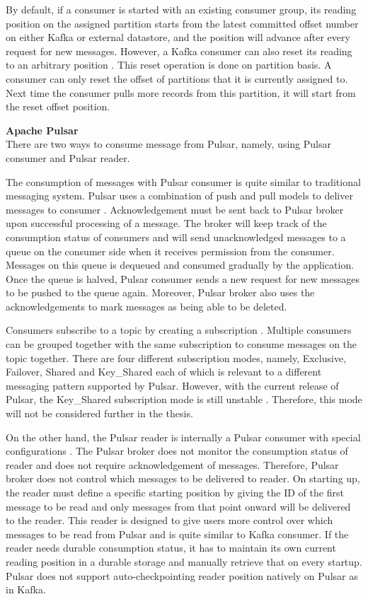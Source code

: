 By default, if a consumer is started with an existing consumer group, its reading position on the assigned partition starts from the latest committed offset number on either Kafka or external datastore, and the position will advance after every request for new messages. However, a Kafka consumer can also reset its reading to an arbitrary position \cite{kafkaconsumerimplement}. This reset operation is done on partition basis. A consumer can only reset the offset of partitions that it is currently assigned to. Next time the consumer pulls more records from this partition, it will start from the reset offset position.

\large \textbf{Apache Pulsar}\\
\normalsize
There are two ways to consume message from Pulsar, namely, using Pulsar consumer and Pulsar reader.

The consumption of messages with Pulsar consumer is quite similar to traditional messaging system. Pulsar uses a combination of push and pull models to deliver messages to consumer \cite{pulsarbinaryprotocol}. Acknowledgement must be sent back to Pulsar broker upon successful processing of a message. The broker will keep track of the consumption status of consumers and will send unacknowledged messages to a queue on the consumer side when it receives permission from the consumer. Messages on this queue is dequeued and consumed gradually by the application. Once the queue is halved, Pulsar consumer sends a new request for new messages to be pushed to the queue again. Moreover, Pulsar broker also uses the acknowledgements to mark messages as being able to be deleted.

Consumers subscribe to a topic by creating a subscription \cite{pulsarconceptmessaging}. Multiple consumers can be grouped together with the same subscription to consume messages on the topic together. There are four different subscription modes, namely, Exclusive, Failover, Shared and Key\_Shared each of which is relevant to a different messaging pattern supported by Pulsar. However, with the current release of Pulsar, the Key\_Shared subscription mode is still unstable \cite{pulsarkaysharedunstable}. Therefore, this mode will not be considered further in the thesis.

On the other hand, the Pulsar reader is internally a Pulsar consumer with special configurations \cite{pulsarconceptclients}. The Pulsar broker does not monitor the consumption status of reader and does not require acknowledgement of messages. Therefore, Pulsar broker does not control which messages to be delivered to reader. On starting up, the reader must define a specific starting position by giving the ID of the first message to be read and only messages from that point onward will be delivered to the reader. This reader is designed to give users more control over which messages to be read from Pulsar and is quite similar to Kafka consumer. If the reader needs durable consumption status, it has to maintain its own current reading position in a durable storage and manually retrieve that on every startup. Pulsar does not support auto-checkpointing reader position natively on Pulsar as in Kafka. 

